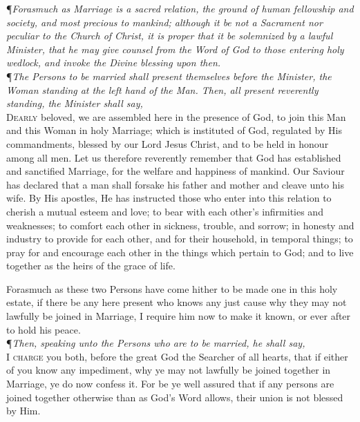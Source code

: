 \noindent\P\textit{Forasmuch as Marriage is a sacred relation, the ground of
human fellowship and society, and most precious to mankind;
although it be not a Sacrament nor peculiar to the Church of
Christ, it is proper that it be solemnized by a lawful Minister,
that he may give counsel from the Word of God to those entering holy wedlock, and invoke the Divine blessing upon then.} \\

\noindent\P\textit{The Persons to be married shall present themselves before the
Minister, the Woman standing at the left hand of the Man.
Then, all present reverently standing, the Minister shall say,} \\

\lettrine{D}{early} beloved, we are assembled here in the presence
of God, to join this Man and this Woman in holy Marriage; which is instituted of God, regulated by His commandments, blessed by our Lord Jesus Christ, and to be
held in honour among all men. Let us therefore reverently
remember that God has established and sanctified Marriage, for the welfare and happiness of mankind. Our Saviour has declared that a man shall forsake his father and
mother and cleave unto his wife. By His apostles, He has
instructed those who enter into this relation to cherish a
mutual esteem and love; to bear with each other’s infirmities and weaknesses; to comfort each other in sickness,
trouble, and sorrow; in honesty and industry to provide
for each other, and for their household, in temporal things;
to pray for and encourage each other in the things which
pertain to God; and to live together as the heirs of the
grace of life.

Forasmuch as these two Persons have come hither to be
made one in this holy estate, if there be any here present
who knows any just cause why they may not lawfully be
joined in Marriage, I require him now to make it known,
or ever after to hold his peace. \\

\noindent\P\textit{Then, speaking unto the Persons who are to be married, he shall say,} \\

\lettrine{I}{ charge} you both, before the great God the Searcher
of all hearts, that if either of you know any impediment,
why ye may not lawfully be joined together in Marriage,
ye do now confess it. For be ye well assured that if any
persons are joined together otherwise than as God’s Word
allows, their union is not blessed by Him. \\

